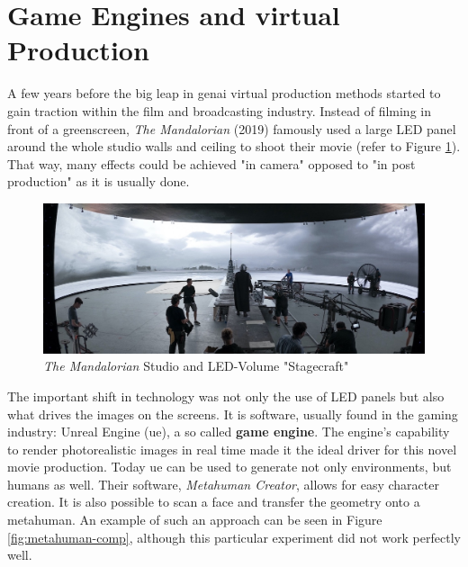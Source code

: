 \documentclass[
  a4paper,  %
  twoside,  %
  bibliography=totoc,
  headsepline,
  cleardoublepage=empty,
  parskip=half,
  draft=false
]{scrbook}
\begin{document}
\section{Game Engines and virtual Production}
\label{sec:bg-virtual-production}
A few years before the big leap in \gls{genai} virtual production methods started to gain traction within the film and broadcasting industry. Instead of filming in front of a greenscreen, \textit{The Mandalorian} (2019) famously used a large LED panel around the whole studio walls and ceiling to shoot their movie (refer to Figure \ref{fig:mando-vps}). That way, many effects could be achieved "in camera" opposed to "in post production" as it is usually done.
\begin{figure}[h]
  \centering
  \includegraphics[width=1\textwidth]{./graphics/images/mandalorian-vp.jpg}
  \caption{\textit{The Mandalorian} Studio and LED-Volume "Stagecraft" \cite{landsiedelGamechanger2021}}
  \label{fig:mando-vps}
\end{figure}
The important shift in technology was not only the use of LED panels but also what drives the images on the screens. It is software, usually found in the gaming industry: Unreal Engine (\gls{ue}), a so called \textbf{game engine}. The engine's capability to render photorealistic images in real time made it the ideal driver for this novel movie production. Today \gls{ue} can be used to generate not only environments, but humans as well. Their software, \textit{Metahuman Creator}, allows for easy character creation. It is also possible to scan a face and transfer the geometry onto a metahuman. An example of such an approach can be seen in Figure \ref{fig:metahuman-comp}, although this particular experiment did not work perfectly well. 
\end{document}
